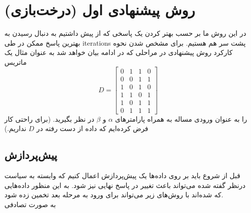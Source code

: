 	
	

\section{روش پیشنهادی اول (درخت‌بازی)}
در این روش ما بر حسب بهتر کردن یک پاسخی که از پیش داشتیم به دنبال رسیدن به بهترین پاسخ ممکن در طی \glspl{iteration} 
پشت سر هم هستیم. برای مشخص شدن نحوه کارکرد روش پیشنهادی در مراحلی که در ادامه بیان خواهد شد به عنوان مثال یک ماتریس 
\begin{equation}
	D=\left[
	\begin{array}{cccc}
		0 & 1 & 1 & 0 \\ 
		0 & 0 & 1 & 1 \\ 
		1 & 0 & 1 & 0 \\ 
		1 & 1 & 0 & 1 \\ 
		1 & 0 & 1 & 1 \\ 
		0 & 1 & 1 & 1
	\end{array} 
	\right]
	\label{eq:ch_pm:pm1_ex_D}
\end{equation}
 را به عنوان ورودی مساله به همراه پارامترهای $\alpha$ و $\beta$ در نظر بگیرید. (برای راحتی کار فرض کرده‌ایم که داده از دست رفته در $D$ نداریم.)

\subsection{پیش‌پردازش}
قبل از شروع باید بر روی داده‌ها یک پیش‌پردازش اعمال کنیم که وابسته به سیاست درنظر گفته شده می‌تواند باعث تغییر در پاسخ نهایی نیز شود. به این منظور داده‌هایی که  شده‌اند با روش‌های زیر ‌می‌تواند برای ورود به مرحله بعد تخمین زده شود.
\\
به صورت تصادفی

